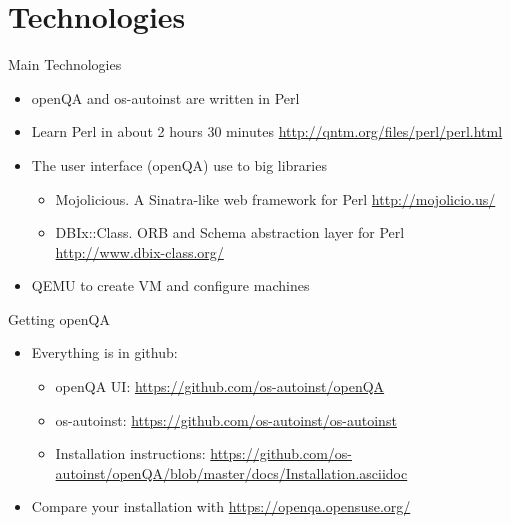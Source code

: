 \documentclass{beamer}
\begin{document}
\section{Technologies}

\begin{frame}{Main Technologies}
  \begin{itemize}
  \item openQA and os-autoinst are written in Perl
  \item Learn Perl in about 2 hours 30 minutes\newline
    {\small\url{http://qntm.org/files/perl/perl.html}}
    \item The user interface (openQA) use to big libraries
      \begin{itemize}
      \item Mojolicious. A Sinatra-like web framework for Perl\newline
        {\small\url{http://mojolicio.us/}}
      \item DBIx::Class. ORB and Schema abstraction layer for Perl\newline
        {\small\url{http://www.dbix-class.org/}}
      \end{itemize}
  \item QEMU to create VM and configure machines
  \end{itemize}
\end{frame}

\begin{frame}{Getting openQA}
  \begin{itemize}
  \item Everything is in github:
    \begin{itemize}
    \item openQA UI:\newline
      {\small\url{https://github.com/os-autoinst/openQA}}
    \item os-autoinst:\newline
      {\small\url{https://github.com/os-autoinst/os-autoinst}}
    \item Installation instructions:\newline
      {\small\url{https://github.com/os-autoinst/openQA/blob/master/docs/Installation.asciidoc}}
    \end{itemize}
  \item Compare your installation with\newline
    {\small\url{https://openqa.opensuse.org/}}
  \end{itemize}
\end{frame}
\end{document}
